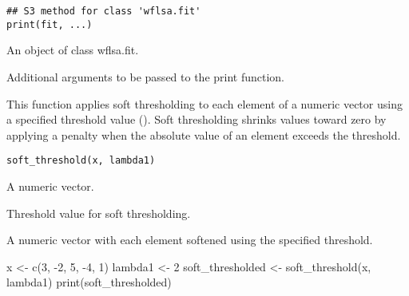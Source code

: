 \documentclass[a4paper]{book}
\begin{document}
%
\begin{Usage}
\begin{verbatim}
## S3 method for class 'wflsa.fit'
print(fit, ...)
\end{verbatim}
\end{Usage}
%
\begin{Arguments}
\begin{ldescription}
\item[\code{fit}] An object of class wflsa.fit.

\item[\code{...}] Additional arguments to be passed to the print function.
\end{ldescription}
\end{Arguments}
%
\begin{Description}\relax
This function applies soft thresholding to each element of a numeric vector
using a specified threshold value (). Soft thresholding shrinks
values toward zero by applying a penalty when the absolute value of an element
exceeds the threshold.
\end{Description}
%
\begin{Usage}
\begin{verbatim}
soft_threshold(x, lambda1)
\end{verbatim}
\end{Usage}
%
\begin{Arguments}
\begin{ldescription}
\item[\code{x}] A numeric vector.

\item[\code{lambda1}] Threshold value for soft thresholding.
\end{ldescription}
\end{Arguments}
%
\begin{Value}
A numeric vector with each element softened using the specified threshold.
\end{Value}
%
\begin{Examples}
\begin{ExampleCode}
x <- c(3, -2, 5, -4, 1)
lambda1 <- 2
soft_thresholded <- soft_threshold(x, lambda1)
print(soft_thresholded)
\end{ExampleCode}
\end{Examples}
%
\end{document}
